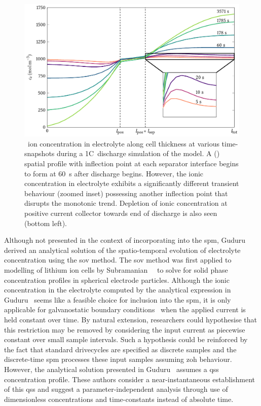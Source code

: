 \begin{figure}[!htbp]
    \centering
    \includegraphics{chapters/spm_analysis/figures/ce_1C_at_various_times.pdf}
    \caption[Electrolyte conc.\ (time-snapshots) along cell thickness for 1C~discharge]{~ion concentration in electrolyte along cell thickness
        at various time-snapshots during a 1C~discharge simulation of the
         model. A  () spatial
        profile  with inflection point at each separator interface begins to
        form at \approx \SI{60}{\second} after discharge begins. However, the
        ionic concentration in electrolyte exhibits a significantly different
        transient behaviour (zoomed inset) possessing another inflection point
        that disrupts the monotonic trend. Depletion of ionic concentration at
        positive current collector  towards end of discharge is also seen
    (bottom left).}
    \label{fig:ce1cdischgwithzoom}
\end{figure}

Although  not presented  in the  context  of incorporating  into the  \gls{spm},
Guduru~\etal~\cite{Guduru2012}   derived   an   analytical   solution   of   the
spatio-temporal  evolution  of  electrolyte concentration  using  the  \gls{sov}
method.  The \gls{sov}  method was  first applied  to modelling  of lithium  ion
cells  by Subramanian~\etal~\cite{Subramanian2001a}  to  solve  for solid  phase
concentration  profiles in  spherical  electrode particles.  Although the  ionic
concentration  in  the electrolyte  computed  by  the analytical  expression  in
Guduru~\etal{} seems like a feasible choice for inclusion into the \gls{spm}, it
is only  applicable for galvanostatic  boundary conditions \ie~when  the applied
current  is held  constant over  time. By  natural extension,  researchers could
hypothesise  that this  restriction  may  be removed  by  considering the  input
current as  piecewise constant  over small sample  intervals. Such  a hypothesis
could  be  reinforced  by  the  fact that  standard  drivecycles  are  specified
as  discrete  samples and  the  discrete-time  \gls{spm} processes  these  input
samples assuming \gls{zoh} behaviour. However, the analytical solution presented
in  Guduru~\etal{}  assumes a  \gls{qss}  concentration  profile. These  authors
consider  a near-instantaneous  establishment of  this \gls{qss}  and suggest  a
parameter-independent analysis  through use of dimensionless  concentrations and
time-constants instead of absolute time.

